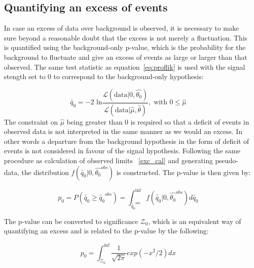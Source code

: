 \subsection{Quantifying an excess of events}
\label{theo_uncert}
In case an excess of data over background is observed, it is necessary to make sure beyond a reasonable doubt that the excess is not merely a fluctuation. This is quantified using the background-only p-value, which is the probability for the background to fluctuate and give an excess of events as large or larger than that observed. The same test statistic as equation~\ref{eq:proflik} is used with the signal stength set to 0 to correspond to the background-only hypothesis:

\begin{equation}
\label{eq:proflik_b}
  \tilde{q_0}=-2\text{ ln}\frac{\mathcal{L}(\text{data}|0,\hat{\theta_0})}{\mathcal{L}(\text{data}|\hat{\mu},\hat{\theta})},\text{   with  } 0\leq\hat{\mu} 
\end{equation}
The constraint on $\hat\mu$ being greater than 0 is required so that a deficit of events in observed data is not interpreted in the same manner as we would an excess. In other words a departure from the background hypothesis in the form of deficit of events is not considered in favour of the signal hypothesis. Following the same procedure as calculation of observed limits ~\ref{exc_cal} and generating pseudo-data, the distribution $f(\tilde{q_0}|0,\hat{\theta_{0}}^{obs})$ is constructed. The p-value is then given by:

\begin{equation}                                                                                                                          
  \label{eq:p0}                                                     
  p_0=P(\tilde{q_0}\geq \tilde{q_0}^{obs})=\int_{\tilde{q_0}^{obs}}^{\inf}f(\tilde{q_0}|0,\hat{\theta_0}^{obs})d\tilde{q_0}               \end{equation}

The p-value can be converted to significance $\mathcal{Z}_0$, which is an equivalent way of quantifying an excess and is related to the p-value by the following:

\begin{equation}                                                                                                                          
  \label{eq:sig}                                                                                                                           p_0=\int_{\mathcal{Z}_0}^{\inf}\frac{1}{\sqrt{2\pi}}exp(-x^2/2)dx
\end{equation}

